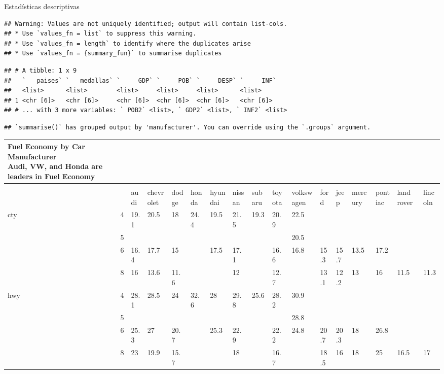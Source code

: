 \documentclass[
  ignorenonframetext,
]{beamer}
\begin{document}
\begin{frame}[fragile]{Estadísticas descriptivas}
\protect\hypertarget{estaduxedsticas-descriptivas}{}
\begin{verbatim}
## Warning: Values are not uniquely identified; output will contain list-cols.
## * Use `values_fn = list` to suppress this warning.
## * Use `values_fn = length` to identify where the duplicates arise
## * Use `values_fn = {summary_fun}` to summarise duplicates
\end{verbatim}

\begin{verbatim}
## # A tibble: 1 x 9
##   `   paises` `   medallas` `     GDP` `     POB` `     DESP` `     INF`
##   <list>      <list>        <list>     <list>     <list>      <list>    
## 1 <chr [6]>   <chr [6]>     <chr [6]>  <chr [6]>  <chr [6]>   <chr [6]> 
## # ... with 3 more variables: ` POB2` <list>, ` GDP2` <list>, ` INF2` <list>
\end{verbatim}

\begin{verbatim}
## `summarise()` has grouped output by 'manufacturer'. You can override using the `.groups` argument.
\end{verbatim}

\captionsetup[table]{labelformat=empty,skip=1pt}
\begin{longtable}{lllllllllllllllll}
\caption*{
\large Fuel Economy by Car Manufacturer\\ 
\small Audi, VW, and Honda are leaders in Fuel Economy\\ 
} \\ 
\toprule
  &    &     &      &       &        &         &          &           &            &             &              &               &                &                 &                  &                   \\ 
\midrule
 &  & audi & chevrolet & dodge & honda & hyundai & nissan & subaru & toyota & volkswagen & ford & jeep & mercury & pontiac & land rover & lincoln \\ 
cty & 4 & 19.1 & 20.5 & 18 & 24.4 & 19.5 & 21.5 & 19.3 & 20.9 & 22.5 &   &   &   &   &   &   \\ 
  & 5 &   &   &   &   &   &   &   &   & 20.5 &   &   &   &   &   &   \\ 
  & 6 & 16.4 & 17.7 & 15 &   & 17.5 & 17.1 &   & 16.6 & 16.8 & 15.3 & 15.7 & 13.5 & 17.2 &   &   \\ 
  & 8 & 16 & 13.6 & 11.6 &   &   & 12 &   & 12.7 &   & 13.1 & 12.2 & 13 & 16 & 11.5 & 11.3 \\ 
hwy & 4 & 28.1 & 28.5 & 24 & 32.6 & 28 & 29.8 & 25.6 & 28.2 & 30.9 &   &   &   &   &   &   \\ 
  & 5 &   &   &   &   &   &   &   &   & 28.8 &   &   &   &   &   &   \\ 
  & 6 & 25.3 & 27 & 20.7 &   & 25.3 & 22.9 &   & 22.2 & 24.8 & 20.7 & 20.3 & 18 & 26.8 &   &   \\ 
  & 8 & 23 & 19.9 & 15.7 &   &   & 18 &   & 16.7 &   & 18.5 & 16 & 18 & 25 & 16.5 & 17 \\ 
\bottomrule
\end{longtable}
\end{frame}
\end{document}

